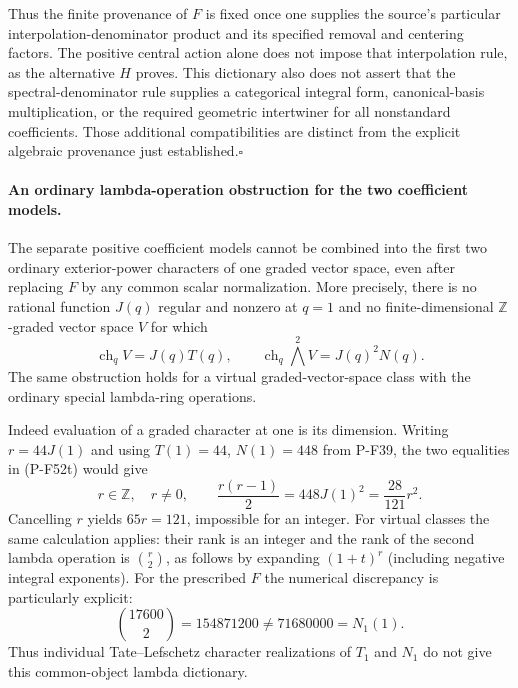 Thus the finite provenance of $F$ is fixed once one supplies the
source's particular interpolation-denominator product and its
specified removal and centering factors. The positive central
action alone does not impose that interpolation rule, as the
alternative $H$ proves. This dictionary also does not assert that
the spectral-denominator rule supplies a categorical integral form,
canonical-basis multiplication, or the required geometric
intertwiner for all nonstandard coefficients. Those additional
compatibilities are distinct from the explicit algebraic
provenance just established.\hfill$\square$

\paragraph{An ordinary lambda-operation obstruction for the two coefficient models.}
The separate positive coefficient models cannot be combined into
the first two ordinary exterior-power characters of one graded
vector space, even after replacing $F$ by any common scalar
normalization. More precisely, there is no rational function
$J(q)$ regular and nonzero at $q=1$ and no finite-dimensional
$\mathbb Z$-graded vector space $V$ for which
\[
 \operatorname{ch}_q V=J(q)T(q),\qquad
 \operatorname{ch}_q\bigwedge^2V=J(q)^2N(q).
                                                        \tag{P-F52t}
\]
The same obstruction holds for a virtual graded-vector-space
class with the ordinary special lambda-ring operations.

Indeed evaluation of a graded character at one is its dimension.
Writing $r=44J(1)$ and using $T(1)=44$, $N(1)=448$ from
P-F39, the two equalities in (P-F52t) would give
\[
 r\in\mathbb Z,\quad r\ne0,\qquad
 \frac{r(r-1)}2=448J(1)^2=\frac{28}{121}r^2.
                                                        \tag{P-F52u}
\]
Cancelling $r$ yields $65r=121$, impossible for an integer.
For virtual classes the same calculation applies: their rank
is an integer and the rank of the second lambda operation is
$\binom r2$, as follows by expanding
$(1+t)^{r}$ (including negative integral exponents).
For the prescribed $F$ the numerical discrepancy is particularly
explicit:
\[
 \binom{17600}{2}=154871200\ne71680000=N_1(1).
                                                        \tag{P-F52v}
\]
Thus individual Tate--Lefschetz character realizations of
$T_1$ and $N_1$ do not give this common-object lambda
dictionary.

